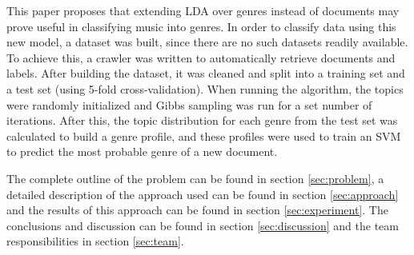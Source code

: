 This paper proposes that extending LDA over genres instead of documents may prove useful in classifying music into genres. In order to classify data using this new model, a dataset was built, since there are no such datasets readily available. To achieve this, a crawler was written to automatically retrieve documents and labels. After building the dataset, it was cleaned and split into a training set and a test set (using 5-fold cross-validation). When running the algorithm, the topics were randomly initialized and Gibbs sampling was run for a set number of iterations. After this, the topic distribution for each genre from the test set was calculated to build a genre profile, and these profiles were used to train an SVM to predict the most probable genre of a new document.

The complete outline of the problem can be found in section \ref{sec:problem}, a detailed description of the approach used can be found in section \ref{sec:approach} and the results of this approach can be found in section \ref{sec:experiment}. The conclusions and discussion can be found in section \ref{sec:discussion} and the team responsibilities in section \ref{sec:team}.